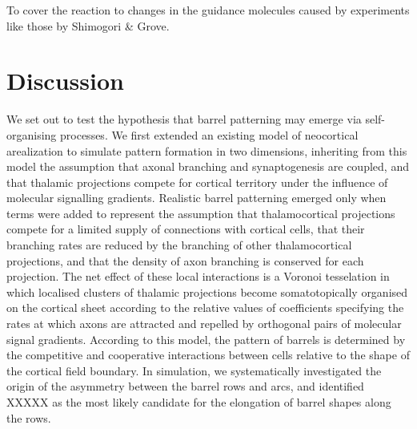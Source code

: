 \documentclass[9pt,twocolumn,twoside,lineno]{pnas-new}
\begin{document}
To cover the reaction to changes in the guidance molecules caused by
experiments like those by Shimogori \& Grove.

\section*{Discussion}

We set out to test the hypothesis that barrel patterning may emerge via
self-organising processes. We first extended an existing model of neocortical
arealization to simulate pattern formation in two dimensions, inheriting from
this model the assumption that axonal branching and synaptogenesis are
coupled, and that thalamic projections compete for cortical territory under
the influence of molecular signalling gradients. Realistic barrel patterning
emerged only when terms were added to represent the assumption that
thalamocortical projections compete for a limited supply of connections with
cortical cells, that their branching rates are reduced by the branching of
other thalamocortical projections, and that the density of axon branching is
conserved for each projection. The net effect of these local interactions is a
Voronoi tesselation in which localised clusters of thalamic projections become
somatotopically organised on the cortical sheet according to the relative
values of coefficients specifying the rates at which axons are attracted and
repelled by orthogonal pairs of molecular signal gradients. According to this
model, the pattern of barrels is determined by the competitive and cooperative
interactions between cells relative to the shape of the cortical field
boundary. In simulation, we systematically investigated the origin of the
asymmetry between the barrel rows and arcs, and identified {\color{red} XXXXX}
as the most likely candidate for the elongation of barrel shapes along the
rows.


\end{document}
